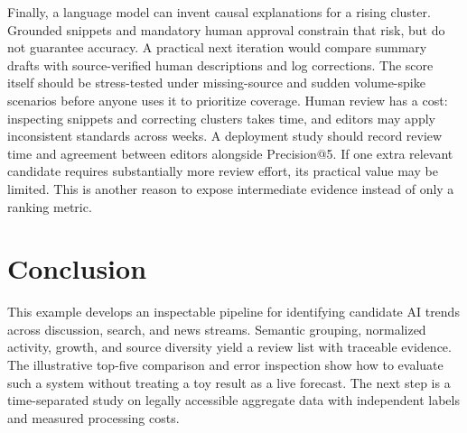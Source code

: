 \documentclass[../../proceedings/main.tex]{subfiles}
\begin{document}
\begin{refsection}
Finally, a language model can invent causal explanations for a rising
cluster. Grounded snippets and mandatory human approval constrain that risk,
but do not guarantee accuracy. A practical next iteration would compare
summary drafts with source-verified human descriptions and log corrections.
The score itself should be stress-tested under missing-source and sudden
volume-spike scenarios before anyone uses it to prioritize coverage.
Human review has a cost: inspecting snippets and correcting clusters takes
time, and editors may apply inconsistent standards across weeks. A deployment
study should record review time and agreement between editors alongside
Precision@5. If one extra relevant candidate requires substantially more
review effort, its practical value may be limited. This is another reason to
expose intermediate evidence instead of only a ranking metric.

\section{Conclusion}
This example develops an inspectable pipeline for identifying candidate AI
trends across discussion, search, and news streams. Semantic grouping,
normalized activity, growth, and source diversity yield a review list with
traceable evidence. The illustrative top-five comparison and error inspection
show how to evaluate such a system without treating a toy result as a live
forecast. The next step is a time-separated study on legally accessible
aggregate data with independent labels and measured processing costs.

\printbibliography[heading=subbibliography,title={References}]
\end{refsection}
\end{document}

